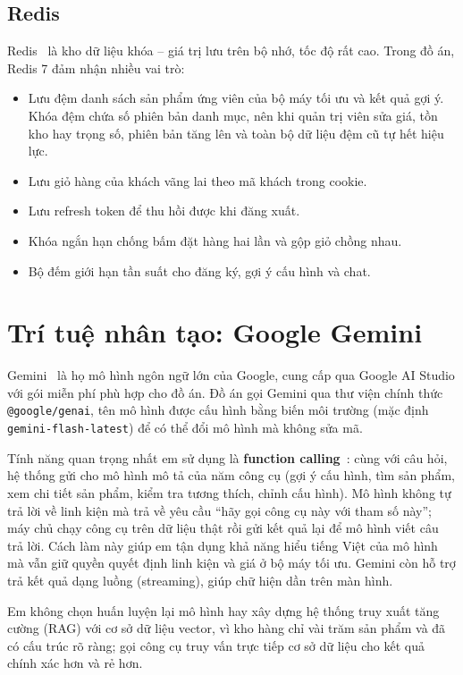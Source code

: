 \subsection{Redis}

Redis~\cite{redis} là kho dữ liệu khóa -- giá trị lưu trên bộ nhớ, tốc độ rất cao. Trong đồ án, Redis 7 đảm nhận nhiều vai trò:
\begin{itemize}
  \item Lưu đệm danh sách sản phẩm ứng viên của bộ máy tối ưu và kết quả gợi ý. Khóa đệm chứa số phiên bản danh mục, nên khi quản trị viên sửa giá, tồn kho hay trọng số, phiên bản tăng lên và toàn bộ dữ liệu đệm cũ tự hết hiệu lực.
  \item Lưu giỏ hàng của khách vãng lai theo mã khách trong cookie.
  \item Lưu refresh token để thu hồi được khi đăng xuất.
  \item Khóa ngắn hạn chống bấm đặt hàng hai lần và gộp giỏ chồng nhau.
  \item Bộ đếm giới hạn tần suất cho đăng ký, gợi ý cấu hình và chat.
\end{itemize}

\section{Trí tuệ nhân tạo: Google Gemini}

Gemini~\cite{gemini} là họ mô hình ngôn ngữ lớn của Google, cung cấp qua Google AI Studio với gói miễn phí phù hợp cho đồ án. Đồ án gọi Gemini qua thư viện chính thức \texttt{@google/genai}, tên mô hình được cấu hình bằng biến môi trường (mặc định \texttt{gemini-flash-latest}) để có thể đổi mô hình mà không sửa mã.

Tính năng quan trọng nhất em sử dụng là \textbf{function calling}~\cite{gemini-fc}: cùng với câu hỏi, hệ thống gửi cho mô hình mô tả của năm công cụ (gợi ý cấu hình, tìm sản phẩm, xem chi tiết sản phẩm, kiểm tra tương thích, chỉnh cấu hình). Mô hình không tự trả lời về linh kiện mà trả về yêu cầu ``hãy gọi công cụ này với tham số này''; máy chủ chạy công cụ trên dữ liệu thật rồi gửi kết quả lại để mô hình viết câu trả lời. Cách làm này giúp em tận dụng khả năng hiểu tiếng Việt của mô hình mà vẫn giữ quyền quyết định linh kiện và giá ở bộ máy tối ưu. Gemini còn hỗ trợ trả kết quả dạng luồng (streaming), giúp chữ hiện dần trên màn hình.

Em không chọn huấn luyện lại mô hình hay xây dựng hệ thống truy xuất tăng cường (RAG) với cơ sở dữ liệu vector, vì kho hàng chỉ vài trăm sản phẩm và đã có cấu trúc rõ ràng; gọi công cụ truy vấn trực tiếp cơ sở dữ liệu cho kết quả chính xác hơn và rẻ hơn.

